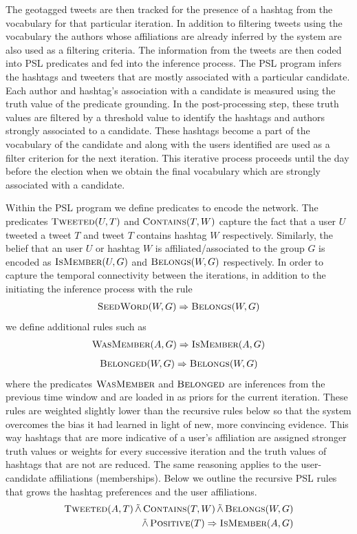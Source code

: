 The geotagged tweets are then tracked for the presence of a hashtag from 
the vocabulary for that particular iteration.
In addition to filtering tweets using the vocabulary the authors whose affiliations are already inferred by the system are also used as a filtering criteria.
The information from
the tweets are then coded into PSL predicates and fed into the inference process.
The PSL program infers the hashtags and tweeters that are mostly associated with 
a particular candidate. 
Each author and hashtag's association with a candidate is measured using the truth value 
of the predicate grounding.
In the post-processing step, these truth values are filtered by a threshold value to identify the hashtags and authors strongly associated to a candidate.
These hashtags become a part of the vocabulary of the candidate and along with the users identified are used as a filter criterion for the next iteration.
This iterative process proceeds until the day before the election when we obtain the final vocabulary which are strongly associated with a candidate.

Within the PSL program we define predicates to encode the network. 
The predicates $\textsc{Tweeted}(U,T)$ and $\textsc{Contains}(T,W)$  capture the fact that a user $U$ tweeted a tweet $T$ and tweet $T$ contains hashtag $W$ respectively. 
Similarly, the belief that an user $U$ or hashtag $W$ is affiliated/associated to the group $G$ is encoded as $\textsc{IsMember}(U,G)$ and $\textsc{Belongs}(W,G)$ respectively.
In order to capture the temporal connectivity between the iterations, in addition to the initiating the inference process with the rule
\begin{align*}
\textsc{SeedWord}(W,G) \Rightarrow \textsc{Belongs}(W,G)
\end{align*}
we define additional rules such as
\begin{align*}
\textsc{WasMember}(A,G) \Rightarrow \textsc{IsMember}(A,G)
\end{align*}
\begin{align*}
\textsc{Belonged}(W,G) \Rightarrow \textsc{Belongs}(W,G)
\end{align*}
where the predicates $\textsc{WasMember}$ and $\textsc{Belonged}$ are inferences from the previous time window and are loaded in as  priors for the current iteration.
These rules are weighted slightly lower than the recursive rules below so that the system overcomes the bias it had learned in light of new, more convincing evidence.
This way hashtags that are more indicative of a user's affiliation are assigned stronger truth values or weights for every successive iteration and the truth values of hashtags that are not are reduced.
The same reasoning applies to the user-candidate affiliations (memberships).
Below we outline the recursive PSL rules that grows the hashtag preferences and the user affiliations. 
\begin{align*}
\begin{split}
\textsc{Tweeted}(A,T) 
	\softand \textsc{Contains}(T,W)
	\softand \textsc{Belongs}(W,G) \\ 
	\softand \textsc{Positive}(T)
	\Rightarrow \textsc{IsMember}(A,G)
\end{split}
\end{align*}

